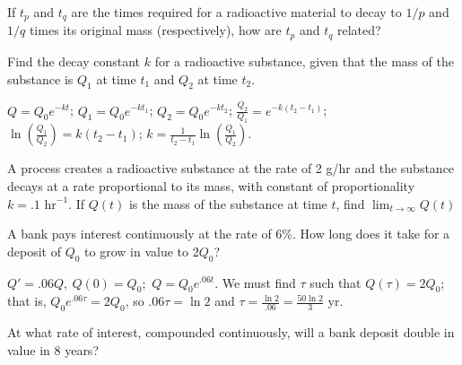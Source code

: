 \documentclass{ximera}
\begin{document}
\begin{problem}\label{exer:4.1.5}
If $t_p$ and $t_q$ are the times required for a radioactive
material to decay to $1/p$ and $1/q$  times
its original mass (respectively), how are $t_p$ and $t_q$ related?
\end{problem}

\begin{problem}\label{exer:4.1.6}
Find the decay constant $k$ for a radioactive substance,
given that the mass of the substance is $Q_1$ at time $t_1$
and $Q_2$ at time $t_2$.
\begin{solution}
$Q=Q_0e^{-kt}$;
$Q_1=Q_0e^{-kt_1}$;
$Q_2=Q_0e^{-kt_2}$; $\frac{Q_2}{Q_1}=e^{-k(t_2-t_1)}$;
    $\ln\left(\frac{Q_1}{Q_2}\right)=k(t_2-t_1)$; $k=\frac{1}{t_2-t_1}\ln\left(\frac{Q_1}{Q_2}\right)$.
\end{solution}
\end{problem}

\begin{problem}\label{exer:4.1.7}
A process creates a radioactive substance at the rate of 2
g/hr and the substance decays at a rate proportional to
its mass, with constant of proportionality
$k=.1 \text{  hr}^{-1}$.  If $Q(t)$ is the mass of the
substance at time $t$, find $\lim_{t\to\infty}Q(t)$\end{problem}

\begin{problem}\label{exer:4.1.8}
A bank pays interest continuously at the rate of 6\%.
How long does it take for a deposit of $Q_0$ to grow in
value to $2Q_0$?
\begin{solution}
$Q'=.06Q,\ Q(0)=Q_0$;\ $Q=Q_0e^{.06t}$. We must find $\tau$
such that $Q(\tau)=2Q_0$; that is, $Q_0e^{.06\tau}=2Q_0$, so
$.06\tau=\ln2$ and $\tau=\frac{\ln2}{.06} =\frac{50\ln2}{3}$ yr.
\end{solution}
\end{problem}



\begin{problem}\label{exer:4.1.9}
At what rate of interest, compounded continuously, will a
bank deposit double in value in 8 years?
\end{problem}
\end{document}
